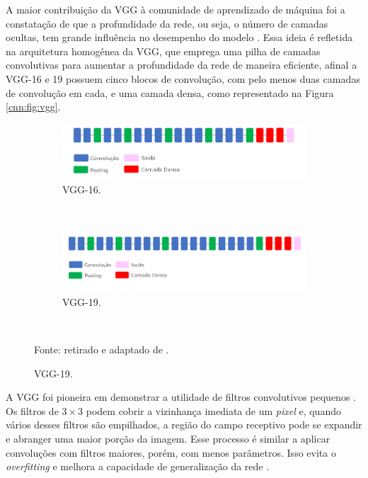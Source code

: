 A maior contribuição da VGG à comunidade de aprendizado de máquina foi a constatação de que a profundidade da rede, ou seja, o número de camadas ocultas, tem grande influência no desempenho do modelo \citep{Simonyan2015}. Essa ideia é refletida na arquitetura homogênea da VGG, que emprega uma pilha de camadas convolutivas para aumentar a profundidade da rede de maneira eficiente, afinal a VGG-16 e 19 possuem cinco blocos de convolução, com pelo menos duas camadas de convolução em cada, e uma camada densa, como representado na Figura \ref{cnn:fig:vgg}.


\begin{figure}[H]
   \caption{Representação de VGGs.}
   \centering
   \label{cnn:fig:vgg}
    \begin{subfigure}[t]{0.8\textwidth}
        \centering
        \includegraphics[width=1\linewidth]{recursos/imagens/deep/vgg16.png}
        \caption{VGG-16.}
        \label{cnn:fig:vgg.1}
    \end{subfigure}%
    ~ 

    \begin{subfigure}[t]{0.8\textwidth}
        \centering
        \includegraphics[width=1\linewidth]{recursos/imagens/deep/vgg19.png}
        \caption{VGG-19.}
        \label{cnn:fig:vgg.2}
    \end{subfigure}%
    ~

    Fonte: retirado e adaptado de \cite{Mahdianpari2018VeryImagery}.
\end{figure}

A VGG foi pioneira em demonstrar a utilidade de filtros convolutivos pequenos \citep{Simonyan2015}. Os filtros de $3 \times 3$ podem cobrir a vizinhança imediata de um \textit{pixel} e, quando vários desses filtros são empilhados, a região do campo receptivo pode se expandir e abranger uma maior porção da imagem. Esse processo é similar a aplicar convoluções com filtros maiores, porém, com menos parâmetros. Isso evita o \textit{overfitting} e melhora a capacidade de generalização da rede \citep{Simonyan2015}.

